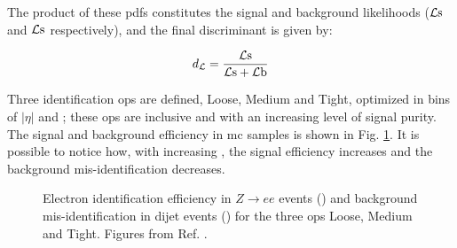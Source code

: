 The product of these \glspl{pdf} constitutes the 
signal and background likelihoods ($\mathcal{L}\rm s$ and $\mathcal{L}\rm s$ respectively), and the final discriminant is given by:

\begin{equation}
 d_\mathcal{L} = \frac{\mathcal{L}\rm s}{\mathcal{L}\rm s + \mathcal{L}\rm b}
\end{equation} 

Three identification \glspl{op} are defined, Loose, Medium and Tight, optimized in bins of $|\eta|$ and \et;
these \glspl{op} are inclusive and with an increasing level of signal purity.
The signal and background efficiency in \gls{mc} samples is shown in Fig. \ref{fig:obj:ele_eff}. It is possible to notice how, with increasing
\et, the signal efficiency increases and the background mis-identification decreases.
 
\begin{figure}[h]
\begin{center}
\end{center}
 \caption{Electron identification efficiency in $Z\rightarrow e e$ events () and background mis-identification in dijet events () for the three \glspl{op} Loose, Medium and Tight. Figures from Ref. \cite{ATLAS:2016iqc}.
 }
  \label{fig:obj:ele_eff}
\end{figure}


